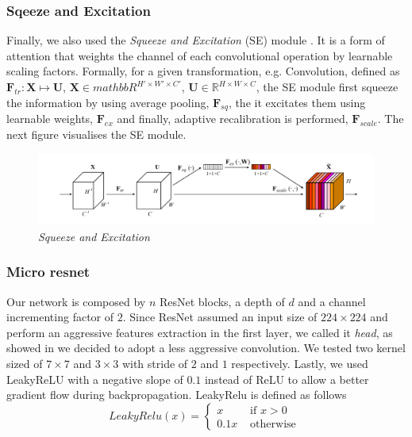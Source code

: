 \documentclass[../document.tex]{subfiles}
\begin{document}
\subsubsection{Sqeeze and Excitation}
Finally, we also used the \emph{Squeeze and Excitation} (SE) module \cite{hu2017squeeze}. It is a form of attention that weights the channel of each convolutional operation by learnable scaling factors. Formally, for a given transformation, e.g. Convolution, defined as $\bm{F}_{tr}  : \bm{X} \mapsto \bm{U}$, $\bm{X} \in mathbb{R}^{H' \times W' \times C'}$, $\bm{U} \in \mathbb{R}^{H \times W \times C}$, the SE module first squeeze the information by using average pooling, $\bm{F}_{sq}$, the it excitates them using learnable weights, $\bm{F}_{ex}$ and finally, adaptive recalibration is performed, $\bm{F}_{scale}$.
The next figure visualises the SE module.
\begin{figure}[H]
    \centering
    \includegraphics[width=\linewidth]{../img/implementation/estimator/se.png}
    \caption{\emph{Squeeze and Excitation} \cite{hu2017squeeze}}
\end{figure}
\subsubsection{Micro resnet}
Our network is composed by $n$ ResNet blocks, a depth of $d$ and a channel incrementing factor of $2$. Since ResNet assumed an input size of $224\times224$ and perform an aggressive features extraction in the first layer, we called it \emph{head}, as showed in  we decided to adopt a less aggressive convolution. We tested two kernel sized of $7\times7$ and $3\times3$ with stride of $2$ and $1$ respectively. Lastly, we used LeakyReLU \cite{leakyrelu} with a negative slope of $0.1$ instead of ReLU to allow a better gradient flow during backpropagation. LeakyRelu is defined as follows
\begin{equation}
LeakyRelu(x)=\left\{\begin{array}{ll}{x} & {\text { if } x>0} \\ {0.1 x} & {\text { otherwise }}\end{array}\right.
\end{equation}
\end{document}
